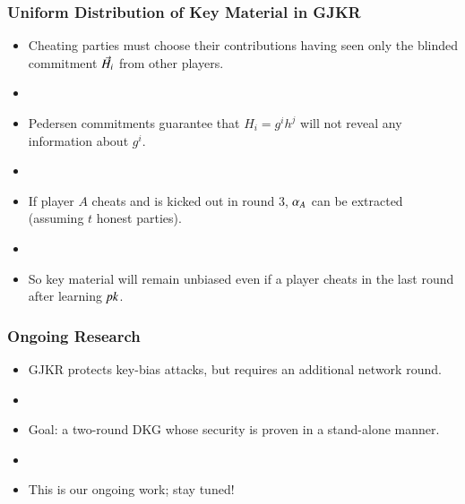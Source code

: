 \documentclass[hyperref={pdfpagelabels=true},table,dvipsnames,14pt,aspectratio=169]{beamer}
\begin{document}
\begin{frame}
  \centering
{}
\end{frame}


\begin{frame}
  \frametitle{Uniform Distribution of Key Material in GJKR}

  \begin{itemize}
    \item Cheating parties must choose their contributions having seen only the blinded commitment $\vec{H}_i$ from other players.
    \item[]
    \item<2-> Pedersen commitments guarantee that $H_i = g^ih^j$ will not reveal any information about $g^i$.
    \item[]
    \item<3-> If player $A$ cheats and is kicked out in round $3$,  $\alpha_A$ can be extracted (assuming $t$ honest parties).
    \item[]
    \item<4-> So key material will remain unbiased even if a player cheats in the last round after learning $\mathit{pk}$.
  \end{itemize}
\end{frame}


\begin{frame}
  \frametitle{Ongoing Research}

  \begin{itemize}
    \item GJKR protects key-bias attacks, but requires an additional network round.
    \item[]
    \item<2-> Goal: a two-round DKG whose security is proven in a stand-alone manner.
    \item[]
    \item<3-> This is our ongoing work; stay tuned!
  \end{itemize}
\end{frame}
\end{document}
